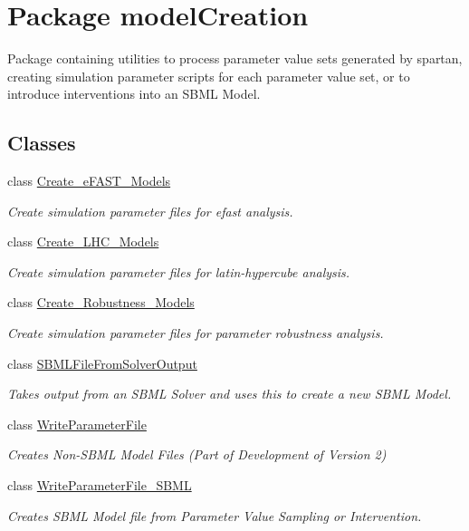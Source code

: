 \hypertarget{namespacemodelCreation}{}\section{Package model\+Creation}
\label{namespacemodelCreation}


Package containing utilities to process parameter value sets generated by spartan, creating simulation parameter scripts for each parameter value set, or to introduce interventions into an S\+B\+M\+L Model.  


\subsection*{Classes}
\begin{DoxyCompactItemize}
\item 
class \hyperlink{classmodelCreation_1_1Create__eFAST__Models}{Create\+\_\+e\+F\+A\+S\+T\+\_\+\+Models}
\begin{DoxyCompactList}\small\item\em Create simulation parameter files for efast analysis. \end{DoxyCompactList}\item 
class \hyperlink{classmodelCreation_1_1Create__LHC__Models}{Create\+\_\+\+L\+H\+C\+\_\+\+Models}
\begin{DoxyCompactList}\small\item\em Create simulation parameter files for latin-\/hypercube analysis. \end{DoxyCompactList}\item 
class \hyperlink{classmodelCreation_1_1Create__Robustness__Models}{Create\+\_\+\+Robustness\+\_\+\+Models}
\begin{DoxyCompactList}\small\item\em Create simulation parameter files for parameter robustness analysis. \end{DoxyCompactList}\item 
class \hyperlink{classmodelCreation_1_1SBMLFileFromSolverOutput}{S\+B\+M\+L\+File\+From\+Solver\+Output}
\begin{DoxyCompactList}\small\item\em Takes output from an S\+B\+M\+L Solver and uses this to create a new S\+B\+M\+L Model. \end{DoxyCompactList}\item 
class \hyperlink{classmodelCreation_1_1WriteParameterFile}{Write\+Parameter\+File}
\begin{DoxyCompactList}\small\item\em Creates Non-\/\+S\+B\+M\+L Model Files (Part of Development of Version 2) \end{DoxyCompactList}\item 
class \hyperlink{classmodelCreation_1_1WriteParameterFile__SBML}{Write\+Parameter\+File\+\_\+\+S\+B\+M\+L}
\begin{DoxyCompactList}\small\item\em Creates S\+B\+M\+L Model file from Parameter Value Sampling or Intervention. \end{DoxyCompactList}\end{DoxyCompactItemize}



